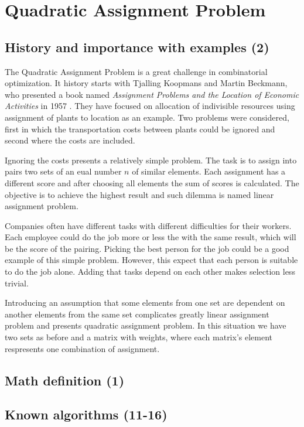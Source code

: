 \section{Quadratic Assignment Problem}
\label{section:background_qap}

\subsection{History and importance with examples (2)}

The Quadratic Assignment Problem is a great challenge in combinatorial optimization.
It history starts with Tjalling Koopmans and Martin Beckmann, who presented a book named \textit{Assignment Problems and the Location of Economic Activities} in 1957 \cite{koopmans-beckmann1957}.
They have focused on allocation of indivisible resources using assignment of plants to location as an example.
Two problems were considered, first in which the transportation costs between plants could be ignored and second where the costs are included.

Ignoring the costs presents a relatively simple problem.
The task is to assign into pairs two sets of an eual number $n$ of similar elements.
Each assignment has a different score and after choosing all elements the sum of scores is calculated.
The objective is to achieve the highest result and such dilemma is named linear assignment problem.

Companies often have different tasks with different difficulties for their workers.
Each employee could do the job more or less the with the same result, which will be the score of the pairing.
Picking the best person for the job could be a good example of this simple problem.
However, this expect that each person is suitable to do the job alone.
Adding that tasks depend on each other makes selection less trivial.

Introducing an assumption that some elements from one set are dependent on another elements from the same set complicates greatly linear assignment problem and presents quadratic assignment problem.
In this situation we have two sets as before and a matrix with weights, where each matrix's element respresents one combination of assignment.

\subsection{Math definition (1)}


\subsection{Known algorithms (11-16)}

